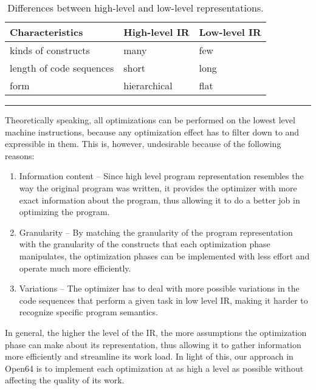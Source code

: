 \begin{table}
\begin{center}
\begin{tabular}{|l||l|l|}
\hline
Characteristics 		& High-level IR   & Low-level IR\\\hline\hline
kinds of constructs 		& many 		  & few \\
length of code sequences 	& short 	  & long \\
form 				& hierarchical    & flat \\ \hline
\end{tabular}
\end{center}
\hrule
\caption{Differences between high-level and low-level representations.}
\label{hl-ll-level-diffs}
\end{table}


Theoretically speaking, all optimizations can be performed on the
lowest level machine instructions, because any optimization effect
has to filter down to and expressible in them. This is, however, undesirable
because of the following reasons: 

\begin{enumerate}
\item
Information content -- Since
high level program representation resembles the way the original
program was written, it provides the optimizer with more exact
information about the program, thus allowing it to do a better job
in optimizing the program.

\item Granularity -- By matching the granularity of the program
representation with the granularity of the constructs that each
optimization phase manipulates, the optimization phases can be
implemented with less effort and operate much more efficiently.

\item Variations -- The optimizer has to deal with more possible
variations in the code sequences that perform a given task in low
level IR, making it harder to recognize specific program semantics.
\end{enumerate}

In general, the higher the level of the IR, the more assumptions
the optimization phase can make about its representation, thus
allowing it to gather information more efficiently and streamline
its work load. In light of this, our approach in Open64 is to
implement each optimization at as high a level as possible without
affecting the quality of its work. 


